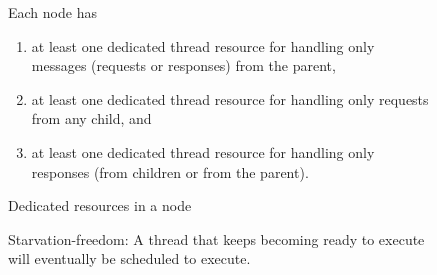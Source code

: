 \begin{figure}\small
\begin{inv}
Each node has 
\begin{enumerate}
\item at least one dedicated thread resource for handling only messages (requests or
responses) from the parent,
\item at least one dedicated thread resource for handling only requests from any
child, and
\item at least one dedicated thread resource for handling only responses (from children
or from the parent).
\end{enumerate}
\label{dedicate}
\end{inv}
\caption{Dedicated resources in a node}
\end{figure}

\begin{figure}\small
\begin{inv}
Starvation-freedom: A thread that keeps becoming ready to execute will
eventually be scheduled to execute.
\end{inv}
\end{figure}
